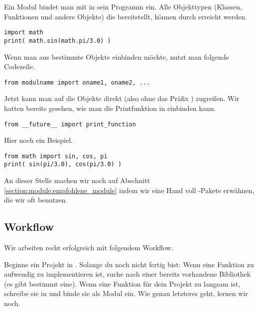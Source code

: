 Ein Modul bindet man mit  in sein Programm ein.
Alle Objekttypen (Klassen, Funktionen und andere Objekte) die  bereitstellt, können durch  erreicht werden.
\begin{lstlisting}
import math
print( math.sin(math.pi/3.0) )
\end{lstlisting}
Wenn man aus  bestimmte Objekte einbinden möchte, nutzt man folgende Codezeile.
\begin{lstlisting}
from modulname import oname1, oname2, ...
\end{lstlisting}
Jetzt kann man auf die Objekte direkt (also ohne das Präfix ) zugreifen.
Wir hatten bereits gesehen, wie man die \PythonDrei Printfunktion in \PythonZwei einbinden kann.
\begin{lstlisting}
from __future__ import print_function
\end{lstlisting}
Hier noch ein Beispiel.
\begin{lstlisting}
from math import sin, cos, pi
print( sin(pi/3.0), cos(pi/3.0) )
\end{lstlisting}

An dieser Stelle machen wir noch auf Abschnitt \ref{section:module:empfohlene_module} indem wir eine Hand voll \Python-Pakete erwähnen, die wir oft benutzen.


\subsection{Workflow}
\label{section:crashkurs:workflow}
Wir arbeiten recht erfolgreich mit folgendem Workflow.

Beginne ein Projekt in \Python.
Solange du noch nicht fertig bist:
Wenn eine Funktion zu aufwendig zu implementieren ist, suche nach einer bereits vorhandene \Python Bibliothek (es gibt bestimmt eine).
Wenn eine Funktion für dein Projekt zu langsam ist, schreibe sie in \CC und binde sie als Modul ein.
Wie genau letzteres geht, lernen wir noch.
